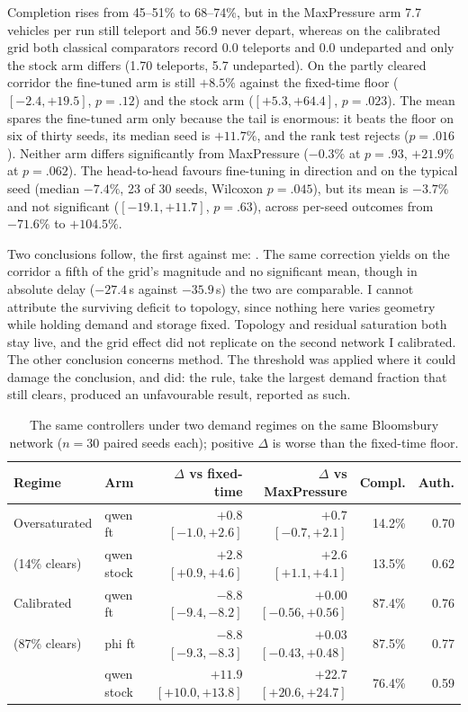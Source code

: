  Completion rises
from 45--51\% to 68--74\%, but in the MaxPressure arm 7.7 vehicles per run
still teleport and 56.9 never depart, whereas on the calibrated grid both
classical comparators record 0.0 teleports and 0.0 undeparted and only the
stock arm differs (1.70 teleports, 5.7 undeparted). On the partly cleared
corridor the fine-tuned arm is still $+8.5\%$ against the fixed-time floor
($[-2.4, +19.5]$, $p{=}.12$) and the stock arm 
($[+5.3, +64.4]$, $p{=}.023$). The mean spares the fine-tuned arm only
because the tail is enormous: it beats the floor on six of thirty seeds,
its median seed is $+11.7\%$, and the rank test rejects ($p{=}.016$).
Neither arm differs significantly from MaxPressure ($-0.3\%$ at $p{=}.93$,
$+21.9\%$ at $p{=}.062$). The head-to-head favours fine-tuning in direction
and on the typical seed (median $-7.4\%$, 23 of 30 seeds, Wilcoxon
$p{=}.045$), but its mean is $-3.7\%$ and not significant
($[-19.1, +11.7]$, $p{=}.63$), across per-seed outcomes from $-71.6\%$ to
$+104.5\%$.

Two conclusions follow, the first against me: . The same
correction yields on the corridor a fifth of the grid's magnitude and no
significant mean, though in absolute delay ($-27.4$\,s against
$-35.9$\,s) the two are comparable. I cannot attribute the surviving
deficit to topology, since nothing here varies geometry while holding
demand and storage fixed. Topology and residual saturation both stay live,
and the grid effect did not replicate on the second network I calibrated.
The other conclusion concerns method. The threshold was applied where it
could damage the conclusion, and did: the rule, take the largest demand
fraction that still clears, produced an unfavourable result, reported as
such.

\begin{table}[t]
\centering
\small
\begin{tabular}{llrrrr}
\toprule
Regime & Arm & $\Delta$ vs fixed-time & $\Delta$ vs MaxPressure & Compl. & Auth. \\
\midrule
Oversaturated & qwen ft & $+0.8$ $[-1.0, +2.6]$ & $+0.7$ $[-0.7, +2.1]$ & 14.2\% & 0.70 \\
(14\% clears) & qwen stock & $\mathbf{+2.8}$ $[+0.9, +4.6]$ & $\mathbf{+2.6}$ $[+1.1, +4.1]$ & 13.5\% & 0.62 \\
\midrule
Calibrated & qwen ft & $\mathbf{-8.8}$ $[-9.4, -8.2]$ & $+0.00$ $[-0.56, +0.56]$ & 87.4\% & 0.76 \\
(87\% clears) & phi ft & $\mathbf{-8.8}$ $[-9.3, -8.3]$ & $+0.03$ $[-0.43, +0.48]$ & 87.5\% & 0.77 \\
 & qwen stock & $\mathbf{+11.9}$ $[+10.0, +13.8]$ & $\mathbf{+22.7}$ $[+20.6, +24.7]$ & 76.4\% & 0.59 \\
\bottomrule
\end{tabular}
\caption{The same controllers under two demand regimes on the same
Bloomsbury network ($n{=}30$ paired seeds each); positive $\Delta$ is worse
than the fixed-time floor.}
\label{tab:calib}
\end{table}

